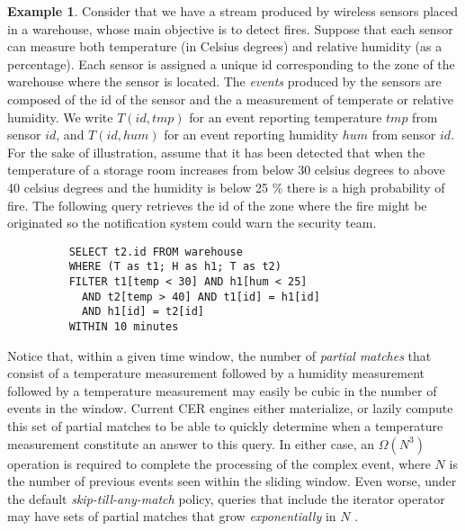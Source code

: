 \textbf{Example 1}. Consider that we have a stream produced by wireless sensors placed in a warehouse, whose main objective is to detect fires. Suppose that each sensor can measure both temperature (in Celsius degrees) and relative humidity (as a percentage). Each sensor is assigned a unique id corresponding to the zone of the warehouse where the sensor is located. The \emph{events} produced by the sensors are composed of the id of the sensor and the a measurement of temperate or relative humidity. We write $T(id, tmp)$ for an event reporting temperature $tmp$ from sensor $id$, and $T(id, hum)$ for an event reporting humidity $hum$ from sensor $id$. For the sake of illustration, assume that it has been detected that when the temperature of a storage room increases from below 30 celsius degrees to above 40 celsius degrees and the humidity is below 25 \% there is a high probability of fire. The following query retrieves the id of the zone where the fire might be originated so the notification system could warn the security team.

\begin{figure}[H]
  \begin{verbatim}
    SELECT t2.id FROM warehouse
    WHERE (T as t1; H as h1; T as t2)
    FILTER t1[temp < 30] AND h1[hum < 25]
      AND t2[temp > 40] AND t1[id] = h1[id]
      AND h1[id] = t2[id]
    WITHIN 10 minutes
  \end{verbatim}
\end{figure}

\vspace{-30pt}
Notice that, within a given time window, the number of \emph{partial matches} that consist of a temperature measurement followed by a humidity measurement followed by a temperature measurement may easily be cubic in the number of events in the window. Current CER engines either materialize, or lazily compute this set of partial matches to be able to quickly determine when a temperature measurement constitute an answer to this query. In either case, an $\Omega(N^{3})$ operation is required to complete the processing of the complex event, where $N$ is the number of previous events seen within the sliding window. Even worse, under the default \emph{skip-till-any-match} \cite{skip-till-any-match} policy, queries that include the iterator operator may have sets of partial matches that grow \emph{exponentially} in $N$ \cite{core}.

